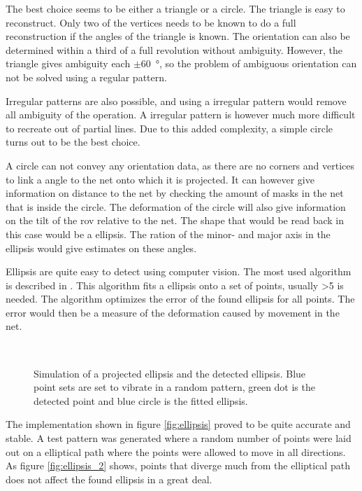 The best choice seems to be either a triangle or a circle. The triangle is easy to reconstruct. Only two of the vertices 
needs to be known to do a full reconstruction if the angles of the triangle is known. The orientation can 
also be determined within a third of a full revolution without ambiguity. However, the triangle 
gives ambiguity each $\pm$\SI{60}{\degree}, so the problem of ambiguous orientation can not be solved using a 
regular pattern.

Irregular patterns are also possible, and using a irregular pattern would remove all ambiguity of the operation. A irregular 
pattern is however much more difficult to recreate out of partial lines. Due to this added complexity, a simple circle turns out 
to be the best choice.

A circle can not convey any orientation data, as there are no corners and vertices to link a angle to the net onto which it is projected.
It can however give information on distance to the net by checking the amount of masks in the net that is inside the circle. The 
deformation of the circle will also give information on the tilt of the \gls{rov} relative to the net. The shape that would be read back in 
this case would be a ellipsis. The ration of the minor- and major axis in the ellipsis would give estimates on these angles. 

Ellipsis are quite easy to detect using computer vision. The most used algorithm is described in \citet{fitzgibbon95}. This algorithm fits a ellipsis onto a set of points, usually >5 is needed. The algorithm optimizes the error of the found ellipsis for all 
points. The error would then be a measure of the deformation caused by movement in the net.

\begin{figure}[htbp]
    \centering
    \\
	\caption{Simulation of a projected ellipsis and the detected ellipsis. Blue point sets are set to vibrate in a random pattern, green dot is the detected point and blue circle is the fitted ellipsis.}
	\label{fig:ellipsis}
\end{figure}

The implementation shown in figure \vref{fig:ellipsis} proved to be quite accurate and stable.
A test pattern was generated where a random number of points were laid out on a 
elliptical path where the points were allowed to move in all directions. As figure \vref{fig:ellipsis_2} shows, points 
that diverge much from the elliptical path does not affect the found ellipsis in a great deal.

